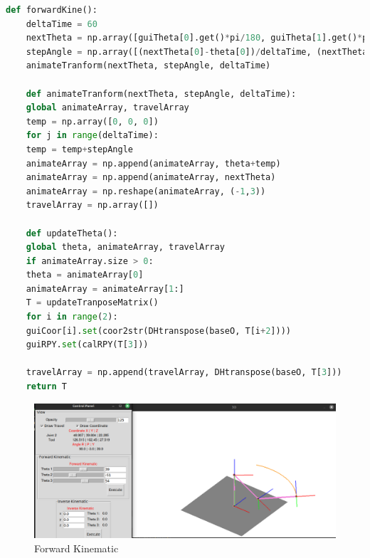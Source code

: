 \vspace{0.5cm}
\begin{lstlisting}[language=python]
	def forwardKine():
	deltaTime = 60
	nextTheta = np.array([guiTheta[0].get()*pi/180, guiTheta[1].get()*pi/180, guiTheta[2].get()*pi/180])
	stepAngle = np.array([(nextTheta[0]-theta[0])/deltaTime, (nextTheta[1]-theta[1])/deltaTime, (nextTheta[2]-theta[2])/deltaTime])
	animateTranform(nextTheta, stepAngle, deltaTime)
	
	def animateTranform(nextTheta, stepAngle, deltaTime):
	global animateArray, travelArray
	temp = np.array([0, 0, 0])
	for j in range(deltaTime):
	temp = temp+stepAngle
	animateArray = np.append(animateArray, theta+temp)
	animateArray = np.append(animateArray, nextTheta)
	animateArray = np.reshape(animateArray, (-1,3))
	travelArray = np.array([])
	
	def updateTheta():
	global theta, animateArray, travelArray
	if animateArray.size > 0:
	theta = animateArray[0]
	animateArray = animateArray[1:]
	T = updateTranposeMatrix()
	for i in range(2):
	guiCoor[i].set(coor2str(DHtranspose(baseO, T[i+2])))
	guiRPY.set(calRPY(T[3]))
	
	travelArray = np.append(travelArray, DHtranspose(baseO, T[3]))
	return T
\end{lstlisting}

\begin{figure}[H]
	\centering
	\includegraphics[width=1\linewidth]{Images/demo_forw.png}
	\caption{Forward Kinematic}
	\label{fig:enter-label7}
\end{figure}